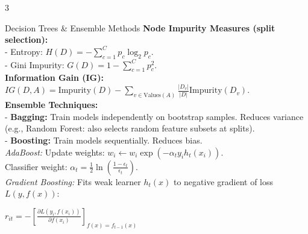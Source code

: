 \documentclass[10pt]{article}
\begin{document}
\begin{multicols*}{3}
\begin{mlBox}{Decision Trees \& Ensemble Methods}
\textbf{Node Impurity Measures (split selection):} \\
- Entropy: $H(D) = -\sum_{c=1}^C p_c \log_2 p_c$. \\
- Gini Impurity: $G(D) = 1 - \sum_{c=1}^C p_c^2$. \\
\textbf{Information Gain (IG):} \\
$IG(D, A) = \text{Impurity}(D) - \sum_{v \in \text{Values}(A)} \frac{|D_v|}{|D|} \text{Impurity}(D_v)$. \\
\textbf{Ensemble Techniques:} \\
- \textbf{Bagging:} Train models independently on bootstrap samples. Reduces variance (e.g., Random Forest: also selects random feature subsets at splits). \\
- \textbf{Boosting:} Train models sequentially. Reduces bias. \\
  \quad \textit{AdaBoost:} Update weights: $w_i \leftarrow w_i \exp(-\alpha_t y_i h_t(x_i))$. \\
  \quad Classifier weight: $\alpha_t = \frac{1}{2} \ln\left(\frac{1-\epsilon_t}{\epsilon_t}\right)$. \\
  \quad \textit{Gradient Boosting:} Fits weak learner $h_t(x)$ to negative gradient of loss $L(y, f(x))$: \\
  {\centering $r_{it} = -\left[ \frac{\partial L(y_i, f(x_i))}{\partial f(x_i)} \right]_{f(x) = f_{t-1}(x)}$\par}
\end{mlBox}

\columnbreak


\end{multicols*}
\end{document}
